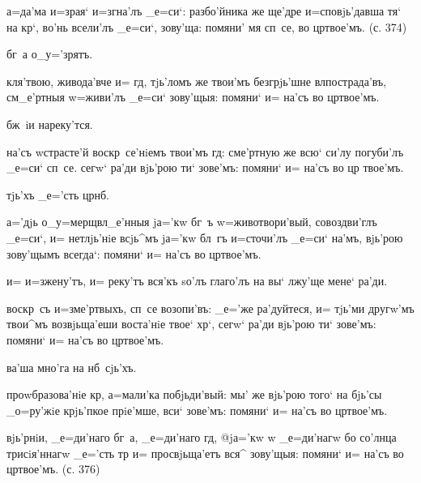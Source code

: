 
а=да'ма и=з\ъ рая` и=згна'лъ _е=си`: разбо'йника же 
ще'дре и=сповjь'давша тя` на кр`, во'нь всели'лъ 
_е=си`, зову'ща: помяни' мя сп~се, во цр твое'мъ. 
(с. 374)

бг~а о_у='зрятъ.

кля'твою, живода'вче и= гд, тjь'ломъ же твои'мъ 
безгрjь'шне вл пострада'въ, см_е'ртныя w=живи'лъ 
_е=си` зову'щыя: помяни` и= на'съ во цр твое'мъ.

бж~iи нареку'тся.

на'съ w\т страсте'й воскр~се'нiемъ твои'мъ гд: 
сме'ртную же всю` си'лу погуби'лъ _е=си` сп~се. сегw` 
ра'ди вjь'рою ти` зове'мъ: помяни` и= на'съ во цр 
твое'мъ.

тjь'хъ _е='сть цр нб.

а='дjь о_у=мерщвл_е'нныя jа='кw бг~ъ w=животвори'вый, 
совоздви'глъ _е=си`, и= нетлjь'нiе всjь^мъ jа='кw бл~гъ 
и=сточи'лъ _е=си` на'мъ, вjь'рою зову'щымъ всегда`: 
помяни` и= на'съ во цр твое'мъ.

и= и=зжену'тъ, и= реку'тъ вся'къ sо'лъ глаго'лъ на вы` 
лжу'ще мене` ра'ди.

воскр~съ и=з\ъ ме'ртвыхъ, сп~се возопи'въ: _е='же 
ра'дуйтеся, и= тjь'ми другw'мъ твои^мъ возвjьща'еши 
воста'нiе твое` хр`, сегw` ра'ди вjь'рою ти` зове'мъ: 
помяни` и= на'съ во цр твое'мъ.

ва'ша мно'га на нб~сjь'хъ.

проwбразова'нiе кр, а=мали'ка побjьди'вый: мы' же 
вjь'рою того` на бjь'сы _о=ру'жiе крjь'пкое прiе'мше, 
вси` зове'мъ: помяни` и= на'съ во цр твое'мъ.

вjь'рнiи, _е=ди'наго бг~а, _е=ди'наго гд, @jа='кw w\т 
_е=ди'нагw бо со'лнца трисiя'ннагw _е='сть 
тр и= просвjьща'етъ вся^ зову'щыя: помяни` 
и= на'съ во цр твое'мъ. (с. 376)

